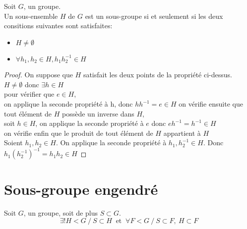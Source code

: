 \documentclass[../main.tex]{subfile}
\begin{document}
\begin{ex}
\begin{prop}
	Soit $G$, un groupe.\\
	Un sous-ensemble $H$ de $G$ est un sous-groupe si et seulement si les deux consitions suivantes sont satisfaites:
\begin{itemize}	
	\item $H \neq \emptyset$
	\item $\forall h_1, h_2 \in H, h_1h_2^{-1} \in H$
\end{itemize}
\end{prop}

\begin{proof}
	On suppose que $H$ satisfait les deux points de la propriété ci-dessus.\\
	$H \neq \emptyset$ donc $\exists h \in H$\\
	pour vérifier que $e \in H$, \\
	on applique la seconde propriété à h, donc $hh^{-1} = e \in H$
	on vérifie ensuite que tout élément de $H$ possède un inverse dans $H$, \\
	soit $h \in H$, on applique la seconde propriété à $e$ donc $eh^{-1} = h^{-1} \in H$\\
	on vérifie enfin que le produit de tout élément de $H$ appartient à $H$\\
	Soient $h_1, h_2 \in H$. On applique la seconde propriété à $h_1, h_2^{-1} \in H$. Donc $h_1(h_2^{-1})^{-1} = h_1h_2 \in H$
\end{proof}
\end{ex}

\section{Sous-groupe engendré}

\begin{prop}
	Soit $G$, un groupe, soit de plus $S \subset G$.\\
	$$\exists! H < G \ / \ S \subset H \ \text{ et } \ \forall F < G \ / \ S \subset F, \ H \subset F$$
\end{prop}
\end{document}
